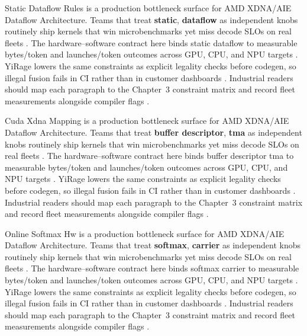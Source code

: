 Static Dataflow Rules is a production bottleneck surface for AMD XDNA/AIE Dataflow Architecture. Teams that treat \textbf{static}, \textbf{dataflow} as independent knobs routinely ship kernels that win microbenchmarks yet miss decode SLOs on real fleets \citep{amd2024xdna,dao2022flashattention}. The hardware--software contract here binds static dataflow to measurable bytes/token and launches/token outcomes across GPU, CPU, and NPU targets \citep{amd2024aie,kwon2023vllm}. YiRage lowers the same constraints as explicit legality checks before codegen, so illegal fusion fails in CI rather than in customer dashboards \citep{dlbook,nvidia2024cudagraphs}. Industrial readers should map each paragraph to the Chapter~3 constraint matrix and record fleet measurements alongside compiler flags \citep{dao2022flashattention,liu2024deepseekv3}.

Cuda Xdna Mapping is a production bottleneck surface for AMD XDNA/AIE Dataflow Architecture. Teams that treat \textbf{buffer descriptor}, \textbf{tma} as independent knobs routinely ship kernels that win microbenchmarks yet miss decode SLOs on real fleets \citep{amd2024aie,kwon2023vllm}. The hardware--software contract here binds buffer descriptor tma to measurable bytes/token and launches/token outcomes across GPU, CPU, and NPU targets \citep{dlbook,nvidia2024cudagraphs}. YiRage lowers the same constraints as explicit legality checks before codegen, so illegal fusion fails in CI rather than in customer dashboards \citep{dao2022flashattention,liu2024deepseekv3}. Industrial readers should map each paragraph to the Chapter~3 constraint matrix and record fleet measurements alongside compiler flags \citep{kwon2023vllm,patel2025llminference}.

Online Softmax Hw is a production bottleneck surface for AMD XDNA/AIE Dataflow Architecture. Teams that treat \textbf{softmax}, \textbf{carrier} as independent knobs routinely ship kernels that win microbenchmarks yet miss decode SLOs on real fleets \citep{dlbook,nvidia2024cudagraphs}. The hardware--software contract here binds softmax carrier to measurable bytes/token and launches/token outcomes across GPU, CPU, and NPU targets \citep{dao2022flashattention,liu2024deepseekv3}. YiRage lowers the same constraints as explicit legality checks before codegen, so illegal fusion fails in CI rather than in customer dashboards \citep{kwon2023vllm,patel2025llminference}. Industrial readers should map each paragraph to the Chapter~3 constraint matrix and record fleet measurements alongside compiler flags \citep{nvidia2024cudagraphs,taxbreak2026}.

